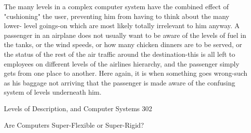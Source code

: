        The many levels in a complex computer system have the combined effect of
       "cushioning" the user, preventing him from having to think about the many lower-
       level goings-on which are most likely totally irrelevant to him anyway. A
       passenger in an airplane does not usually want to be aware of the levels of fuel in
       the tanks, or the wind speeds, or how many chicken dinners are to be served, or
       the status of the rest of the air traffic around the destination-this is all left to
       employees on different levels of the airlines hierarchy, and the passenger simply
       gets from one place to another. Here again, it is when something goes wrong-such
       as his baggage not arriving that the passenger is made aware of the confusing
       system of levels underneath him.




Levels of Description, and Computer Systems                                            302

                       Are Computers Super-Flexible or Super-Rigid?

